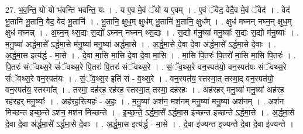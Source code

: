 \documentclass[17pt]{extarticle}
\begin{document}
27. भ॒व॒न्ति॒ यो यो भ॑वन्ति भवन्ति॒ यः । . य ए॒व मे॒वं ॅयो य ए॒वम् । . ए॒वं ॅवेद॒ वेदै॒व मे॒वं ॅवेद॑ । . वेद॑ भू॒तानि॑ भू॒तानि॒ वेद॒ वेद॑ भू॒तानि॑ । . भू॒तानि॒ क्षुध॒म् क्षुध॑म् भू॒तानि॑ भू॒तानि॒ क्षुध᳚म् । . क्षुध॑ मघ्नन् नघ्न॒न् क्षुध॒म् क्षुध॑ मघ्नन्न् । . अ॒घ्न॒न् थ्स॒द्यः स॒द्यो᳚ ऽघ्नन् नघ्नन् थ्स॒द्यः । . स॒द्यो म॑नु॒ष्या॑ मनु॒ष्याः᳚ स॒द्यः स॒द्यो म॑नु॒ष्याः᳚ । . म॒नु॒ष्या॑ अर्द्धमा॒से᳚ ऽर्द्धमा॒से म॑नु॒ष्या॑ मनु॒ष्या॑ अर्द्धमा॒से । . अ॒र्द्ध॒मा॒से दे॒वा दे॒वा अ॑र्द्धमा॒से᳚ ऽर्द्धमा॒से दे॒वाः । . अ॒र्द्ध॒मा॒स इत्य॑र्द्ध - मा॒से । . दे॒वा मा॒सि मा॒सि दे॒वा दे॒वा मा॒सि । . मा॒सि पि॒तरः॑ पि॒तरो॑ मा॒सि मा॒सि पि॒तरः॑ । . पि॒तरः॑ संॅवथ्स॒रे सं॑ॅवथ्स॒रे पि॒तरः॑ पि॒तरः॑ संॅवथ्स॒रे । . सं॒ॅव॒थ्स॒रे वन॒स्पत॑यो॒ वन॒स्पत॑यः संॅवथ्स॒रे सं॑ॅवथ्स॒रे वन॒स्पत॑यः । . सं॒ॅव॒थ्स॒र इति॑ सं - व॒थ्स॒रे । . वन॒स्पत॑य॒ स्तस्मा॒त् तस्मा॒द् वन॒स्पत॑यो॒ वन॒स्पत॑य॒ स्तस्मा᳚त् । . तस्मा॒ दह॑रह॒ रह॑रह॒ स्तस्मा॒त् तस्मा॒ दह॑रहः । . अह॑रहर् मनु॒ष्या॑ मनु॒ष्या॑ अह॑रह॒ रह॑रहर् मनु॒ष्याः᳚ । . अह॑रह॒रित्यहः॑ - अ॒हः॒ । . म॒नु॒ष्या॑ अश॑न॒ मश॑नम् मनु॒ष्या॑ मनु॒ष्या॑ अश॑नम् । . अश॑न मिच्छन्त इच्छ॒न्ते ऽश॑न॒ मश॑न मिच्छन्ते । . इ॒च्छ॒न्ते॒ ऽर्द्ध॒मा॒से᳚ ऽर्द्धमा॒स इ॑च्छन्त इच्छन्ते ऽर्द्धमा॒से । . अ॒र्द्ध॒मा॒से दे॒वा दे॒वा अ॑र्द्धमा॒से᳚ ऽर्द्धमा॒से दे॒वाः । . अ॒र्द्ध॒मा॒स इत्य॑र्द्ध - मा॒से । . दे॒वा इ॑ज्यन्त इज्यन्ते दे॒वा दे॒वा इ॑ज्यन्ते । \newline
\end{document}
